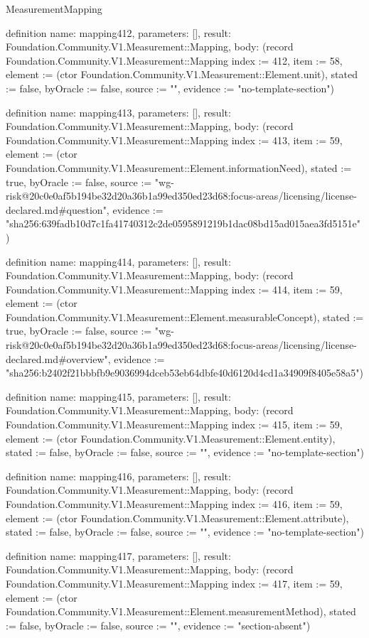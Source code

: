 \begin{lexlean}{MeasurementMapping}
\begin{semanticmodule}
definition{
  name: mapping412,
  parameters: [],
  result: Foundation.Community.V1.Measurement::Mapping,
  body: (record Foundation.Community.V1.Measurement::Mapping {index := 412, item := 58, element := (ctor Foundation.Community.V1.Measurement::Element.unit), stated := false, byOracle := false, source := "", evidence := "no-template-section"})
}

definition{
  name: mapping413,
  parameters: [],
  result: Foundation.Community.V1.Measurement::Mapping,
  body: (record Foundation.Community.V1.Measurement::Mapping {index := 413, item := 59, element := (ctor Foundation.Community.V1.Measurement::Element.informationNeed), stated := true, byOracle := false, source := "wg-risk@20c0e0af5b194be32d20a36b1a99ed350ed23d68:focus-areas/licensing/license-declared.md#question", evidence := "sha256:639fadb10d7c1fa41740312c2de0595891219b1dac08bd15ad015aea3fd5151e"})
}

definition{
  name: mapping414,
  parameters: [],
  result: Foundation.Community.V1.Measurement::Mapping,
  body: (record Foundation.Community.V1.Measurement::Mapping {index := 414, item := 59, element := (ctor Foundation.Community.V1.Measurement::Element.measurableConcept), stated := true, byOracle := false, source := "wg-risk@20c0e0af5b194be32d20a36b1a99ed350ed23d68:focus-areas/licensing/license-declared.md#overview", evidence := "sha256:b2402f21bbbfb9e9036994dceb53eb64dbfe40d6120d4cd1a34909f8405e58a5"})
}

definition{
  name: mapping415,
  parameters: [],
  result: Foundation.Community.V1.Measurement::Mapping,
  body: (record Foundation.Community.V1.Measurement::Mapping {index := 415, item := 59, element := (ctor Foundation.Community.V1.Measurement::Element.entity), stated := false, byOracle := false, source := "", evidence := "no-template-section"})
}

definition{
  name: mapping416,
  parameters: [],
  result: Foundation.Community.V1.Measurement::Mapping,
  body: (record Foundation.Community.V1.Measurement::Mapping {index := 416, item := 59, element := (ctor Foundation.Community.V1.Measurement::Element.attribute), stated := false, byOracle := false, source := "", evidence := "no-template-section"})
}

definition{
  name: mapping417,
  parameters: [],
  result: Foundation.Community.V1.Measurement::Mapping,
  body: (record Foundation.Community.V1.Measurement::Mapping {index := 417, item := 59, element := (ctor Foundation.Community.V1.Measurement::Element.measurementMethod), stated := false, byOracle := false, source := "", evidence := "section-absent"})
}


\end{semanticmodule}
\end{lexlean}
